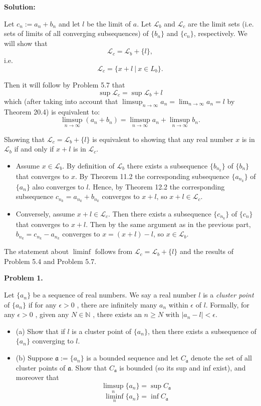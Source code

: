\documentclass[12pt]{article}
\def\black{\color{black}}
\def\green{\color{rltgreen}}
\newcommand\bi{\begin{itemize}}
\newcommand\ei{\end{itemize}}
\renewcommand\|{\ | \ }
\newcommand\ra{\rightarrow}
\newcommand\mf\mathfrak
\newcommand\mc\mathcal
\newcommand\N{\mathbb{N}}
\def\pb#1{{\green \bf Problem #1.}\hskip 8pt \black}
\def\sol{\textbf{Solution:}}
\newcommand\mfa{\mf a}
\def\sequence#1{$\{{#1}_n\}$}
\def\subsequence#1{$\{{#1}_{n_k}\}$}
\newcommand\e\epsilon
\newcommand\limn{\lim_{n \ra \infty}}
\newcommand\limsupn{\limsup_{n \ra \infty}}
\newcommand\foranyeps{for any $\epsilon > 0$ }
\newcommand\givenanyn{given any $N \in \N$ }
\newcommand\thereexistsn{there exists an $n \geq N$ }
\begin{document}
\sol

Let $c_n := a_n + b_n$ and let $l$ be the limit of $a$. 
Let $\mc L_b$ and $\mc L_c$ are the limit sets
(i.e. sets of limits of all converging subsequences)
of \sequence b and \sequence c, respectively. We will show that
\[
\mc L_c = \mc L_b + \{ l\},
\]
i.e.
\[
\mc L_c = \{ x + l \| x \in L_b \}.
\]

Then it will follow by Problem 5.7 that 
\[
\sup \mc L_c = \sup \mc L_b + l
\]
which (after taking into account that $\limsupn a_n = \limn a_n = l$
by Theorem 20.4) is equivalent to:
\[
\limsupn (a_n + b_n) = \limsupn a_n + \limsupn b_n.
\]

Showing that $\mc L_c = \mc L_b + \{ l\}$ is equivalent to showing that
any real number $x$ is in $\mc L_b$ if and only if $x + l$ is in $\mc L_c$.

\bi
\item
Assume $x \in \mc L_b$. By definition of $\mc L_b$ there exists a
subsequence \subsequence b of \sequence b that converges to $x$. 
By Theorem 11.2 the corresponding subsequence \subsequence a of 
\sequence a also converges to $l$. Hence, by Theorem 12.2
the corresponding subsequence $c_{n_k} = a_{n_k} + b_{n_k}$
converges to $x + l$, so $x + l \in \mc L_c$.
\item
Conversely, assume $x + l \in \mc L_c$. Then there exists a 
subsequence \subsequence c of \sequence c that converges to $x + l$.
Then by the same argument as in the previous part, 
$b_{n_k} = c_{n_k} - a_{n_k}$ converges to $x = (x + l) - l$, so
$x \in \mc L_b$.
\ei

The statement about $\liminf$ follows from $\mc L_c = \mc L_b + \{ l\}$
and the results of Problem 5.4 and Problem 5.7.
\vskip 12pt

\pb 1

Let \sequence a be a sequence of real numbers. We say a real number $l$ is a 
\emph{cluster point} of \sequence a if \foranyeps, there are infinitely many
$a_n$ within $\e$ of $l$. Formally, \foranyeps, \givenanyn, \thereexistsn
with $|a_n - l| < \e$.

\bi
\item[(a)]
Show that if $l$ is a cluster point of \sequence a, then there exists a 
subsequence of \sequence a converging to $l$.
\item[(b)]
Suppose $\mfa :=$\sequence a is a bounded sequence and let $C_\mfa$ denote
the set of all cluster points of $\mfa$. Show that $C_\mfa$ is bounded
(so its sup and inf exist), and moreover that
\[
\limsup_n\{a_n\} = \sup C_\mfa
\]
\[
\liminf_n\{a_n\} = \inf C_\mfa
\]
\ei
\end{document}
